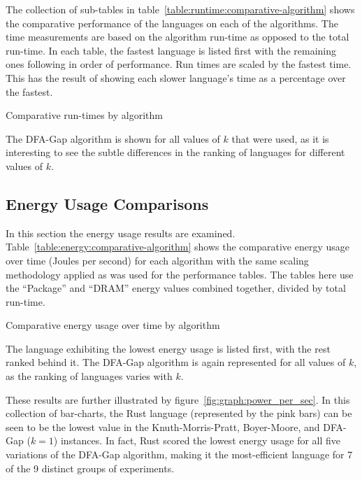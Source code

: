 The collection of sub-tables in table~\ref{table:runtime:comparative-algorithm} shows the comparative performance of the languages on each of the algorithms. The time measurements are based on the algorithm run-time as opposed to the total run-time. In each table, the fastest language is listed first with the remaining ones following in order of performance. Run times are scaled by the fastest time. This has the result of showing each slower language's time as a percentage over the fastest.

\begin{table}[!htb]

\caption{Comparative run-times by algorithm}
\label{table:runtime:comparative-algorithm}
\end{table}

The DFA-Gap algorithm is shown for all values of $k$ that were used, as it is interesting to see the subtle differences in the ranking of languages for different values of $k$.

\subsection{Energy Usage Comparisons}
\label{subsec:energy_comp}

In this section the energy usage results are examined. Table~\ref{table:energy:comparative-algorithm} shows the comparative energy usage over time (Joules per second) for each algorithm with the same scaling methodology applied as was used for the performance tables. The tables here use the ``Package'' and ``DRAM'' energy values combined together, divided by total run-time.

\begin{table}[!htb]

\caption{Comparative energy usage over time by algorithm}
\label{table:energy:comparative-algorithm}
\end{table}

The language exhibiting the lowest energy usage is listed first, with the rest ranked behind it. The DFA-Gap algorithm is again represented for all values of $k$, as the ranking of languages varies with $k$.

These results are further illustrated by figure~\ref{fig:graph:power_per_sec}. In this collection of bar-charts, the Rust language (represented by the pink bars) can be seen to be the lowest value in the Knuth-Morris-Pratt, Boyer-Moore, and DFA-Gap ($k=1$) instances. In fact, Rust scored the lowest energy usage for all five variations of the DFA-Gap algorithm, making it the most-efficient language for 7 of the 9 distinct groups of experiments.

